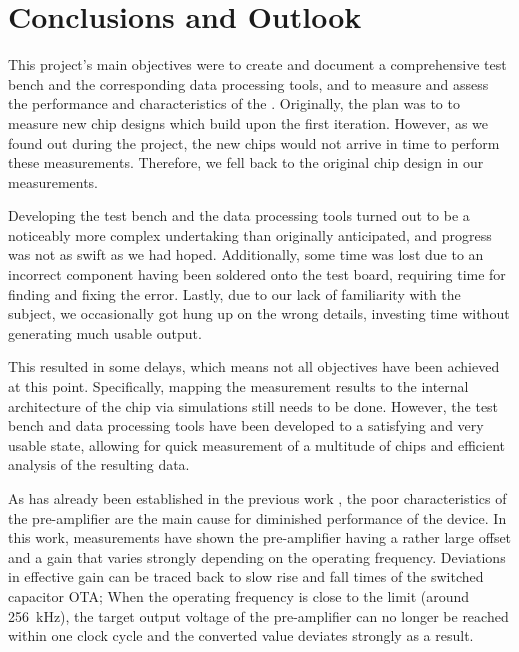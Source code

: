 \chapter{Conclusions and Outlook}
\label{chap:conclusions}

This project's  main objectives  were to create  and document  a comprehensive
test bench  and the corresponding  data processing  tools, and to  measure and
assess  the performance  and  characteristics of  the  \sdm.  Originally,  the
plan  was  to  to  measure  new  chip  designs  which  build  upon  the  first
iteration. However, as  we found out during  the project, the new  chips would
not arrive in  time to perform these measurements. Therefore, we  fell back to
the original chip design in our measurements.

Developing the  test bench and  the data processing tools  turned out to  be a
noticeably more complex undertaking  than originally anticipated, and progress
was not as swift as we had hoped.   Additionally, some time was lost due to an
incorrect component having  been soldered onto the test  board, requiring time
for finding and fixing the error. Lastly,  due to our lack of familiarity with
the subject, we occasionally got hung  up on the wrong details, investing time
without generating much usable output.

This  resulted in  some  delays,  which means  not  all  objectives have  been
achieved  at  this point. Specifically,  mapping  the  measurement results  to
the  internal architecture  of  the chip  via simulations  still  needs to  be
done.  However, the  test bench and data processing tools  have been developed
to a  satisfying and very  usable state, allowing  for quick measurement  of a
multitude of chips and efficient analysis of the resulting data.

As has  already been  established in the  previous work  \cite{ref:gloor}, the
poor characteristics  of the pre-amplifier  are the main cause  for diminished
performance  of  the  device.   In  this work,  measurements  have  shown  the
pre-amplifier having  a rather large  offset and  a gain that  varies strongly
depending  on the  operating frequency. Deviations  in effective  gain can  be
traced back to  slow rise and fall  times of the switched  capacitor OTA; When
the operating frequency is close  to the limit (around \SI{256}{\kilo\hertz}),
the target output voltage of the pre-amplifier can no longer be reached within
one clock cycle and the converted value deviates strongly as a result.

